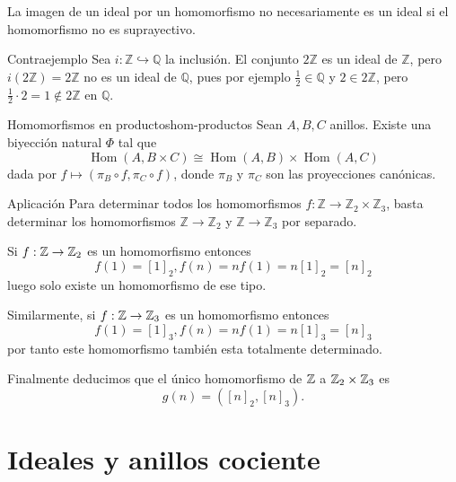 \begin{remark}
    La imagen de un ideal por un homomorfismo no necesariamente es un ideal si el homomorfismo no es suprayectivo.
\end{remark}

\begin{example}{Contraejemplo}{}
    Sea \(i: \mathbb{Z} \hookrightarrow \mathbb{Q}\) la inclusión. El conjunto \(2\mathbb{Z}\) es un ideal de \(\mathbb{Z}\), pero \(i(2\mathbb{Z}) = 2\mathbb{Z}\) no es un ideal de \(\mathbb{Q}\), pues por ejemplo \(\frac{1}{2} \in \mathbb{Q}\) y \(2 \in 2\mathbb{Z}\), pero \(\frac{1}{2} \cdot 2 = 1 \notin 2\mathbb{Z}\) en \(\mathbb{Q}\).
\end{example}

\begin{theorem}{Homomorfismos en productos}{hom-productos}
    Sean \(A, B, C\) anillos. Existe una biyección natural $\Phi$ tal que
    \[
    \operatorname{Hom}(A, B \times C) \cong \operatorname{Hom}(A, B) \times \operatorname{Hom}(A, C)
    \]
    dada por \(f \mapsto (\pi_B \circ f, \pi_C \circ f)\), donde \(\pi_B\) y \(\pi_C\) son las proyecciones canónicas.
\end{theorem}

\begin{example}{Aplicación}{}
    Para determinar todos los homomorfismos \(f: \mathbb{Z} \to \mathbb{Z}_2 \times \mathbb{Z}_3\), basta determinar los homomorfismos \(\mathbb{Z} \to \mathbb{Z}_2\) y \(\mathbb{Z} \to \mathbb{Z}_3\) por separado.
\end{example}

\begin{proofbox}
    Si $f : \mathbb{Z} \to \mathbb{Z}_2$ es un homomorfismo entonces
    \[
    f(1) = [1]_2, f(n) = nf(1) = n[1]_2 = [n]_2
    \]
    luego solo existe un homomorfismo de ese tipo.

    Similarmente, si $f : \mathbb{Z} \to \mathbb{Z}_3$ es un homomorfismo entonces
    \[
    f(1) = [1]_3, f(n) = nf(1) = n[1]_3 = [n]_3
    \]
    por tanto este homomorfismo también esta totalmente determinado.

    Finalmente deducimos que el único homomorfismo de $\mathbb{Z}$ a $\mathbb{Z}_2 \times \mathbb{Z}_3$ es 
    \[
    g(n) = ([n]_2, [n]_3).
    \]
\end{proofbox}

\clearpage
\section{Ideales y anillos cociente}

